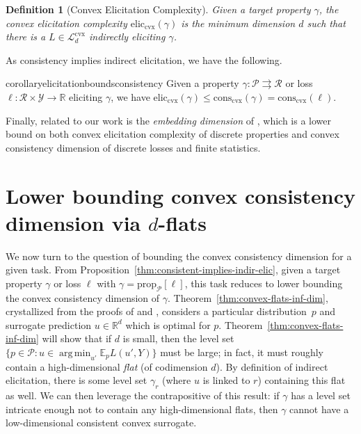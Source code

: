 \documentclass{article} %
\newcommand{\reals}{\mathbb{R}}
\newcommand{\prop}[2][\mathcal{P}]{\mathrm{prop}_{#1}[#2]}
\newcommand{\eliccvx}{\mathrm{elic}_\mathrm{cvx}}
\newcommand{\conscvx}{\mathrm{cons}_\mathrm{cvx}}
\newcommand{\E}{\mathbb{E}}
\newcommand{\Lcvx}{\mathcal{L}^{\mathrm{cvx}}}
\newcommand{\R}{\mathcal{R}}
\renewcommand{\P}{\mathcal{P}}
\newcommand{\Y}{\mathcal{Y}}
\newcommand{\exploss}[3]{\E_{#3} #1(#2,Y)}
\newcommand{\toto}{\rightrightarrows}
\newtheorem{definition}{Definition}
\DeclareMathOperator*{\argmin}{arg\,min}
\begin{document}
\begin{definition}[Convex Elicitation Complexity]\label{def:cvx-elic-complex}
	Given a target property $\gamma$, the \emph{convex elicitation complexity} $\eliccvx(\gamma)$ is the minimum dimension $d$ such that there is a $L \in \Lcvx_d$ indirectly eliciting $\gamma$.
\end{definition}

As consistency implies indirect elicitation, we have the following.


\begin{restatable}{corollary}{elicitationboundsconsistency}\label{cor:elic-lb-consis-dim}
	Given a property $\gamma : \P \toto \R$ or loss $\ell:\R \times \Y \to \reals$ eliciting $\gamma$, we have $\eliccvx(\gamma) \leq \conscvx(\gamma) = \conscvx(\ell)$.
\end{restatable}

Finally, related to our work is the \emph{embedding dimension} of \citet{finocchiaro2020embedding}, which is a lower bound on both convex elicitation complexity of discrete properties and convex consistency dimension of discrete losses and finite statistics.




\section{Lower bounding convex consistency dimension via $d$-flats}\label{sec:char-convex}
We now turn to the question of bounding the convex consistency dimension for a given task.
From Proposition~\ref{thm:consistent-implies-indir-elic}, given a target property $\gamma$ or loss $\ell$ with $\gamma = \prop{\ell}$, this task reduces to lower bounding the convex consistency dimension of $\gamma$.
Theorem~\ref{thm:convex-flats-inf-dim}, crystallized from the proofs of \citet[Theorem 16]{ramaswamy2016convex} and \citet[Theorem 9]{agarwal2015consistent}, considers a particular distribution~$p$ and surrogate prediction $u \in \reals^d$ which is optimal for $p$.
Theorem~\ref{thm:convex-flats-inf-dim} will show that if $d$ is small, then the level set $\{p \in \P : u \in \argmin_{u'} \exploss{L}{u'}{p}\}$ must be large; in fact, it must roughly contain a high-dimensional \emph{flat} (of codimension $d$).
By definition of indirect elicitation, there is some level set $\gamma_r$ (where $u$ is linked to $r$) containing this flat as well.
We can then leverage the contrapositive of this result: if $\gamma$ has a level set intricate enough not to contain any high-dimensional flats, then $\gamma$ cannot have a low-dimensional consistent convex surrogate.
\end{document}
